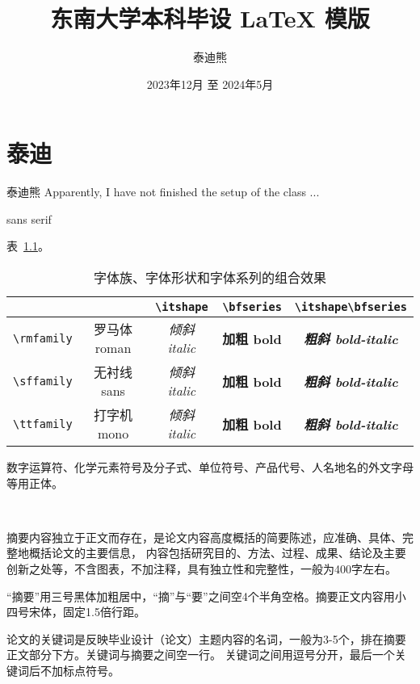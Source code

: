 \documentclass[fontset = mac ms]{seuthesis2024b}
\title{东南大学本科毕设 \LaTeX{} 模版}
\author{泰迪熊}
\date{2023年12月 至 2024年5月}
\begin{document}
  \maketitle

  \chapter{泰迪}

  泰迪熊 Apparently, I have not finished the setup of the class ...
  
  \textsf{sans serif}

  表~\ref{tab:font-effect}。

  \begin{table}[htbp]
    \centering
    \caption{字体族、字体形状和字体系列的组合效果}
    \label{tab:font-effect}
    \begin{tabular}{c|cccc}
      & & \verb|\itshape| & \verb|\bfseries| & \verb|\itshape\bfseries| \\
      \hline
      \verb|\rmfamily| & \rmfamily 罗马体 roman & \rmfamily\itshape 倾斜 italic & \rmfamily\bfseries 加粗 bold & \rmfamily\itshape\bfseries 粗斜 bold-italic \\
      \verb|\sffamily| & \sffamily 无衬线 sans  & \sffamily\itshape 倾斜 italic & \sffamily\bfseries 加粗 bold & \sffamily\itshape\bfseries 粗斜 bold-italic \\
      \verb|\ttfamily| & \ttfamily 打字机 mono  & \ttfamily\itshape 倾斜 italic & \ttfamily\bfseries 加粗 bold & \ttfamily\itshape\bfseries 粗斜 bold-italic
    \end{tabular}
  \end{table}

  \clearpage

  \noindent
  数字运算符、化学元素符号及分子式、单位符号、产品代号、人名地名的外文字母等用正体。

  ~

  \clearpage

  摘要内容独立于正文而存在，是论文内容高度概括的简要陈述，应准确、具体、完整地概括论文的主要信息，
  内容包括研究目的、方法、过程、成果、结论及主要创新之处等，不含图表，不加注释，具有独立性和完整性，一般为400字左右。

  “摘要”用三号黑体加粗居中，“摘”与“要”之间空4个半角空格。摘要正文内容用小四号宋体，固定1.5倍行距。
  
  论文的关键词是反映毕业设计（论文）主题内容的名词，一般为3-5个，排在摘要正文部分下方。关键词与摘要之间空一行。
  关键词之间用逗号分开，最后一个关键词后不加标点符号。
\end{document}
